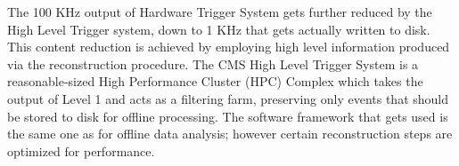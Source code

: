 The 100 KHz output of Hardware Trigger System gets further reduced by the High Level Trigger system, down to 1 KHz that gets actually written to disk. This content reduction is achieved by employing high level information produced via the reconstruction procedure. The CMS High Level Trigger System is a reasonable-sized High Performance Cluster (HPC) Complex which takes the output of Level 1 and acts as a filtering farm, preserving only events that should be stored to disk for offline processing. The software framework that gets used is the same one as for offline data analysis; however certain reconstruction steps are optimized for performance.







